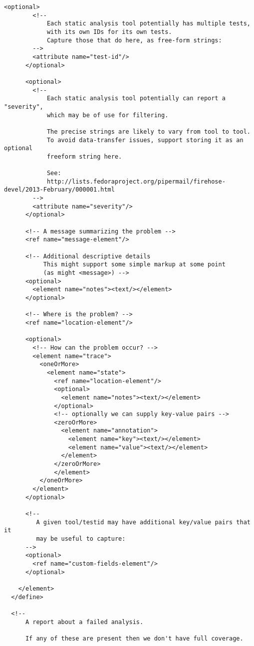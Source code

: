 \begin{lstlisting}[frame=none]
      <optional>
        <!--
            Each static analysis tool potentially has multiple tests,
            with its own IDs for its own tests.
            Capture those that do here, as free-form strings:
        -->
        <attribute name="test-id"/>
      </optional>

      <optional>
        <!--
            Each static analysis tool potentially can report a "severity",
            which may be of use for filtering.

            The precise strings are likely to vary from tool to tool.
            To avoid data-transfer issues, support storing it as an optional
            freeform string here.

            See:
            http://lists.fedoraproject.org/pipermail/firehose-devel/2013-February/000001.html
        -->
        <attribute name="severity"/>
      </optional>

      <!-- A message summarizing the problem -->
      <ref name="message-element"/>

      <!-- Additional descriptive details
           This might support some simple markup at some point
           (as might <message>) -->
      <optional>
        <element name="notes"><text/></element>
      </optional>

      <!-- Where is the problem? -->
      <ref name="location-element"/>

      <optional>
        <!-- How can the problem occur? -->
        <element name="trace">
          <oneOrMore>
            <element name="state">
              <ref name="location-element"/>
              <optional>
                <element name="notes"><text/></element>
              </optional>
              <!-- optionally we can supply key-value pairs -->
              <zeroOrMore>
                <element name="annotation">
                  <element name="key"><text/></element>
                  <element name="value"><text/></element>
                </element>
              </zeroOrMore>
              </element>
          </oneOrMore>
        </element>
      </optional>

      <!--
         A given tool/testid may have additional key/value pairs that it
         may be useful to capture:
      -->
      <optional>
        <ref name="custom-fields-element"/>
      </optional>

    </element>
  </define>

  <!--
      A report about a failed analysis.

      If any of these are present then we don't have full coverage.


\end{lstlisting}
